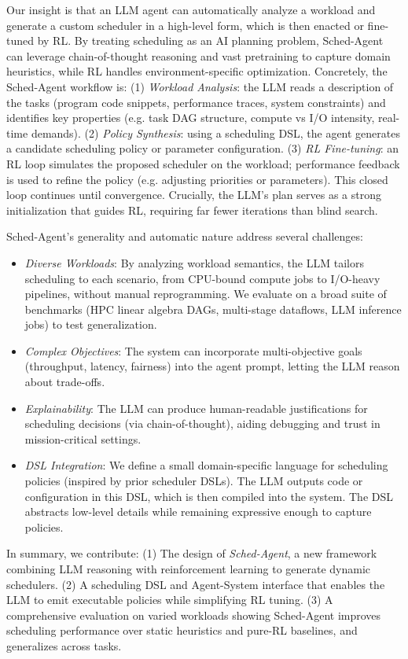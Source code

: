 Our insight is that an LLM agent can automatically analyze a workload and generate a custom scheduler in a high-level form, which is then enacted or fine-tuned by RL. By treating scheduling as an AI planning problem, Sched-Agent can leverage chain-of-thought reasoning and vast pretraining to capture domain heuristics, while RL handles environment-specific optimization. Concretely, the Sched-Agent workflow is: (1) \emph{Workload Analysis}: the LLM reads a description of the tasks (program code snippets, performance traces, system constraints) and identifies key properties (e.g. task DAG structure, compute vs I/O intensity, real-time demands). (2) \emph{Policy Synthesis}: using a scheduling DSL, the agent generates a candidate scheduling policy or parameter configuration. (3) \emph{RL Fine-tuning}: an RL loop simulates the proposed scheduler on the workload; performance feedback is used to refine the policy (e.g. adjusting priorities or parameters). This closed loop continues until convergence. Crucially, the LLM's plan serves as a strong initialization that guides RL, requiring far fewer iterations than blind search.

Sched-Agent's generality and automatic nature address several challenges:

\begin{itemize}
\item \emph{Diverse Workloads}: By analyzing workload semantics, the LLM tailors scheduling to each scenario, from CPU-bound compute jobs to I/O-heavy pipelines, without manual reprogramming. We evaluate on a broad suite of benchmarks (HPC linear algebra DAGs, multi-stage dataflows, LLM inference jobs) to test generalization.
\item \emph{Complex Objectives}: The system can incorporate multi-objective goals (throughput, latency, fairness) into the agent prompt, letting the LLM reason about trade-offs.
\item \emph{Explainability}: The LLM can produce human-readable justifications for scheduling decisions (via chain-of-thought), aiding debugging and trust in mission-critical settings.
\item \emph{DSL Integration}: We define a small domain-specific language for scheduling policies (inspired by prior scheduler DSLs). The LLM outputs code or configuration in this DSL, which is then compiled into the system. The DSL abstracts low-level details while remaining expressive enough to capture policies.
\end{itemize}

In summary, we contribute: (1) The design of \emph{Sched-Agent}, a new framework combining LLM reasoning with reinforcement learning to generate dynamic schedulers. (2) A scheduling DSL and Agent-System interface that enables the LLM to emit executable policies while simplifying RL tuning. (3) A comprehensive evaluation on varied workloads showing Sched-Agent improves scheduling performance over static heuristics and pure-RL baselines, and generalizes across tasks.